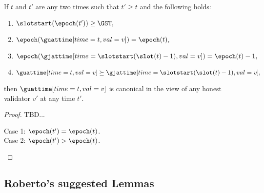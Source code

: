 \documentclass{article}
\begin{document}
\begin{lemma}
    If $t$ and $t'$ are any two times such that $t' \geq t$ and the following holds:
    
    \begin{enumerate}
        \item $\slotstart(\epoch(t')) \geq \GST,$
        \item $\epoch(\guattime[time=t,val=v]) = \epoch(t),$
        \item $\epoch(\gjattime[time=\slotstart(\slot(t)-1),val=v]) = \epoch(t) - 1,$
        \item $\guattime[time=t,val=v] \succeq \gjattime[time=\slotstart(\slot(t)-1),val=v],$
    \end{enumerate}
    
then $\guattime[time=t,val=v]$ is canonical in the view of any honest validator $v'$ at any time $t'$.
\end{lemma}

\begin{proof}
    TBD...

    \begin{description}
        \item[Case 1: $\epoch(t') = \epoch(t)$.]
        \item[Case 2: $\epoch(t') > \epoch(t)$.]  
    \end{description}
\end{proof}

\subsection*{Roberto's suggested Lemmas}

%
\end{document}
